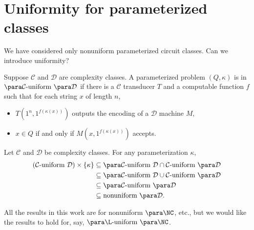 \newcommand{\uniform}[1]{#1 \dash \text{uniform }}

\section{Uniformity for parameterized classes}

We have considered only nonuniform parameterized circuit classes.
Can we introduce uniformity?

\begin{definition}
  Suppose $\mathcal{C}$ and $\mathcal{D}$ are complexity classes.
  A parameterized problem $(Q, \kappa)$ is in $\uniform{\para \mathcal{C}} \para \mathcal{D}$ if there is a $\mathcal{C}$ transducer $T$ and a computable function $f$ such that for each string $x$ of length $n$,
  \begin{itemize}
  \item $T(1^n, 1^{f(\kappa(x))})$ outputs the encoding of a $\mathcal{D}$ machine $M$,
  \item $x \in Q$ if and only if $M(x, 1^{f(\kappa(x))})$ accepts.
  \end{itemize}
\end{definition}

\begin{proposition}
  Let $\mathcal{C}$ and $\mathcal{D}$ be complexity classes.
  For any parameterization $\kappa$,
  \begin{align*}
    (\uniform{\mathcal{C}} \mathcal{D}) \times \{\kappa\}
    & \subseteq
    \uniform{\para \mathcal{C}} \mathcal{D} \cap \uniform{\mathcal{C}} \para \mathcal{D} \\
    & \subseteq
    \uniform{\para \mathcal{C}} \mathcal{D} \cup \uniform{\mathcal{C}} \para \mathcal{D} \\
    & \subseteq
    \uniform{\para \mathcal{C}} \para \mathcal{D} \\
    & \subseteq
    \text{nonuniform } \para \mathcal{D}. \\
  \end{align*}
\end{proposition}

All the results in this work are for nonuniform $\para \NC$, etc., but we would like the results to hold for, say, $\uniform{\para \L} \para \NC$.
